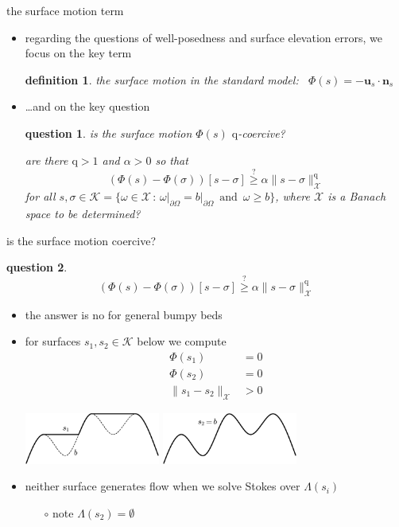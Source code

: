 \documentclass[10pt,svgnames]{beamer}
\newtheorem*{defn}{definition}
\newtheorem*{question}{question}
\newcommand{\bn}{\mathbf{n}}
\newcommand{\bu}{\mathbf{u}}
\newcommand{\cK}{\mathcal{K}}
\newcommand{\cX}{\mathcal{X}}
\newcommand{\qq}{\mathrm{q}}
\newcommand{\aler}[1]{{\color{FireBrick} #1}}
\begin{document}
\begin{frame}{the surface motion term}

\begin{itemize}
\item regarding the questions of well-posedness and surface elevation errors, we focus on the key term

\begin{defn}
the \aler{surface motion} in the standard model: \, $\Phi(s) = -\bu_s\cdot \bn_s$
\end{defn}

\item \dots and on the key question
\begin{question}
is the surface motion $\Phi(s)$ $\qq$-coercive?

are there $\qq>1$ and $\alpha>0$ so that
$$(\Phi(s) - \Phi(\sigma))[s-\sigma] \stackrel{?}{\ge} \alpha \|s-\sigma\|_{\cX}^\qq$$
for all $s,\sigma \in \cK = \{\omega \in \cX\,:\, \omega\big|_{\partial \Omega} = b\big|_{\partial \Omega} \, \text{ and } \, \omega \ge b\}$, where $\cX$ is a Banach space to be determined?
\end{question}
\end{itemize}
\end{frame}


\begin{frame}{is the surface motion coercive?}

\begin{question}
$$(\Phi(s) - \Phi(\sigma))[s-\sigma] \stackrel{?}{\ge} \alpha \|s-\sigma\|_{\cX}^\qq$$
\end{question}

\begin{itemize}
\item the answer is \aler{no} for general bumpy beds
\item for surfaces $s_1,s_2\in\cK$ below we compute
\begin{align*}
\Phi(s_1) &= 0 \\
\Phi(s_2) &= 0 \\
\|s_1-s_2\|_{\cX} &> 0
\end{align*}

\hfill \includegraphics[width=0.35\textwidth]{figs/filled.png} \qquad \includegraphics[width=0.35\textwidth]{figs/icefree.png}
\item neither surface generates flow when we solve Stokes over $\Lambda(s_i)$
    \begin{itemize}
    \item[$\circ$] note $\Lambda(s_2)=\emptyset$
    \end{itemize}
\end{itemize}
\end{frame}
\end{document}
